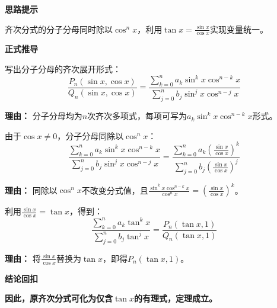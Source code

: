 \begin{proofbox}
	\textbf{\textcolor{CProof}{思路提示}}

	齐次分式的分子分母同时除以$\cos^n x$，利用$\tan x=\frac{\sin x}{\cos x}$实现变量统一。

	\medskip
	\textbf{\textcolor{CProof}{正式推导}}
	\begin{description}[style=nextline, leftmargin=2.8em, labelsep=0.5em, itemsep=0.55em]
		\item[\textbf{步骤一（齐次识别）：}]写出分子分母的齐次展开形式：
			\[
				\frac{P_n(\sin x,\cos x)}{Q_n(\sin x,\cos x)} = \frac{\sum_{k=0}^{n}a_k\sin^k x\cos^{n-k}x}{\sum_{j=0}^{n}b_j\sin^j x\cos^{n-j}x}
			\]
			\par\textbf{理由：} 分子分母均为$n$次齐次多项式，每项可写为$a_k\sin^k x\cos^{n-k}x$形式。

		\item[\textbf{步骤二（同除消元）：}]由于$\cos x\neq0$，分子分母同除以$\cos^n x$：
			\[
				\frac{\sum_{k=0}^{n}a_k\sin^k x\cos^{n-k}x}{\sum_{j=0}^{n}b_j\sin^j x\cos^{n-j}x} = \frac{\sum_{k=0}^{n}a_k\left(\frac{\sin x}{\cos x}\right)^k}{\sum_{j=0}^{n}b_j\left(\frac{\sin x}{\cos x}\right)^j}
			\]
			\par\textbf{理由：} 同除以$\cos^n x$不改变分式值，且$\frac{\sin^k x\cos^{n-k}x}{\cos^n x}=(\frac{\sin x}{\cos x})^k$。

		\item[\textbf{步骤三（化正切）：}]利用$\frac{\sin x}{\cos x}=\tan x$，得到：
			\[
				\frac{\sum_{k=0}^{n}a_k\tan^k x}{\sum_{j=0}^{n}b_j\tan^j x} = \frac{P_n(\tan x,1)}{Q_n(\tan x,1)}
			\]
			\par\textbf{理由：} 将$\frac{\sin x}{\cos x}$替换为$\tan x$，即得$P_n(\tan x,1)$。
	\end{description}

	\medskip
	\textbf{\textcolor{CProof}{结论回扣}}

	\textbf{因此，原齐次分式可化为仅含$\tan x$的有理式，定理成立。}
\end{proofbox}
